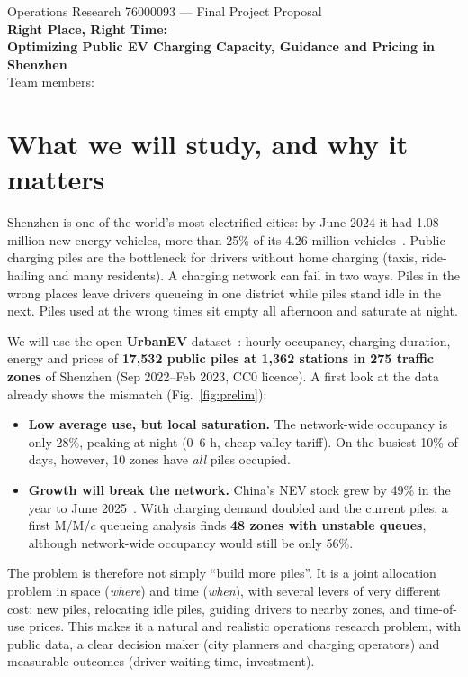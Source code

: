 \documentclass[11pt,a4paper]{article}
\begin{document}
\begin{center}
{\large Operations Research 76000093 --- Final Project Proposal}\\[6pt]
{\LARGE\bfseries Right Place, Right Time:\\[2pt] Optimizing Public EV Charging Capacity, Guidance and Pricing in Shenzhen}\\[8pt]
Team members: \TeamNames
\end{center}

\section{What we will study, and why it matters}
Shenzhen is one of the world's most electrified cities: by June 2024 it had 1.08 million new-energy vehicles, more than 25\% of its 4.26 million vehicles~\cite{cnev2024}. Public charging piles are the bottleneck for drivers without home charging (taxis, ride-hailing and many residents). A charging network can fail in two ways. Piles in the wrong places leave drivers queueing in one district while piles stand idle in the next. Piles used at the wrong times sit empty all afternoon and saturate at night.

We will use the open \textbf{UrbanEV} dataset~\cite{li2025urbanev}: hourly occupancy, charging duration, energy and prices of \textbf{17{,}532 public piles at 1{,}362 stations in 275 traffic zones} of Shenzhen (Sep 2022--Feb 2023, CC0 licence). A first look at the data already shows the mismatch (Fig.~\ref{fig:prelim}):
\begin{itemize}[leftmargin=1.3em,itemsep=1pt]
\item \textbf{Low average use, but local saturation.} The network-wide occupancy is only 28\%, peaking at night (0--6 h, cheap valley tariff). On the busiest 10\% of days, however, 10 zones have \emph{all} piles occupied.
\item \textbf{Growth will break the network.} China's NEV stock grew by 49\% in the year to June 2025~\cite{cnev2025}. With charging demand doubled and the current piles, a first M/M/$c$ queueing analysis finds \textbf{48 zones with unstable queues}, although network-wide occupancy would still be only 56\%.
\end{itemize}
The problem is therefore not simply ``build more piles''. It is a joint allocation problem in space (\emph{where}) and time (\emph{when}), with several levers of very different cost: new piles, relocating idle piles, guiding drivers to nearby zones, and time-of-use prices. This makes it a natural and realistic operations research problem, with public data, a clear decision maker (city planners and charging operators) and measurable outcomes (driver waiting time, investment).
\end{document}
